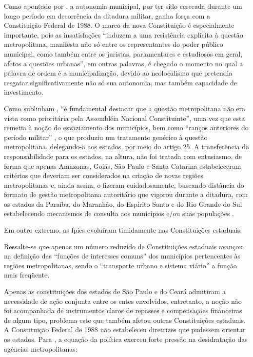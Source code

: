 	Como apontado por , a autonomia municipal, por ter sido cerceada durante um longo período em decorrência da ditadura militar, ganha força com a Constituição Federal de 1988. O marco da nova Constituição é especialmente importante, pois as insatisfações ``induzem a uma resistência explícita à questão metropolitana, manifesta não só entre os representantes do poder público municipal, como também entre os juristas, parlamentares e estudiosos em geral, afetos a questões urbanas'', em outras palavras, é chegado o momento no qual a palavra de ordem é a municipalização, devido ao neolocalismo que pretendia resgatar significativamente não só sua autonomia, mas também capacidade de investimento.
	
	Como sublinham , ``é fundamental destacar que a questão metropolitana não era vista como prioritária pela Assembléia Nacional Constituinte'', uma vez que esta remetia à noção do esvaziamento dos municípios, bem como ``ranços anteriores do período militar'' , o que produziu um tratamento genérico à questão metropolitana, delegando-a aos estados, por meio do artigo 25. A transferência da responsabilidade para os estados, na altura, não foi tratada com entusiasmo, de forma que apenas Amazonas, Goiás, São Paulo e Santa Catarina estabeleceram critérios que deveriam ser considerados na criação de novas regiões metropolitanas e, ainda assim, o fizeram cuidadosamente, buscando distância do formato de gestão metropolitana autoritário que vigorou durante a ditadura, com os estados da Paraíba, do Maranhão, do Espírito Santo e do Rio Grande do Sul estabelecendo mecanismos de consulta aos municípios e/ou suas populações \cite[p. 102]{guia2015a}.
	
	Em outro extremo, as \gls{fpics} evoluíram timidamente nas Constituições estaduais:
	
	\begin{citacao}
		Ressalte-se que apenas um número reduzido de Constituições estaduais avançou na definição das “funções de interesses comuns” dos municípios pertencentes às regiões metropolitanas, sendo o ``transporte urbano e sistema viário'' a função mais freqüente. \cite[p. 102]{guia2015a}
	\end{citacao}

	Apenas as constituições dos estados de São Paulo e do Ceará admitiram a necessidade de ação conjunta entre os entes envolvidos, entretanto, a noção não foi acompanhada de instrumentos claros de repasses e compensações financeiras de algum tipo, problema este que também afetou outras Constituições estaduais. A Constituição Federal de 1988 não estabeleceu diretrizes que pudessem orientar os estados. Para , a equação da política exerceu forte pressão na desidratação das agências metropolitanas:
	
